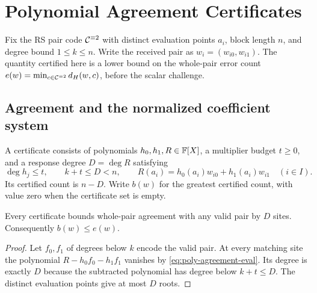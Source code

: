 \section{Polynomial Agreement Certificates}\label{sec:polynomial-agreement}

Fix the RS pair code \(\mathcal C^{\equiv 2}\) with distinct evaluation points \(a_i\),
block length \(n\), and degree bound \(1\le k\le n\). Write the received pair
as \(w_i=(w_{i0},w_{i1})\). The quantity certified here is a lower bound on
the whole-pair error count
\(e(w)=\min_{c\in\mathcal C^{\equiv 2}}d_H(w,c)\), before the scalar challenge.

\subsection{Agreement and the normalized coefficient system}

\begin{definition}
A certificate consists of polynomials \(h_0,h_1,R\in\mathbb{F}[X]\), a multiplier
budget \(t\ge0\), and a response degree \(D=\deg R\) satisfying
\begin{equation}\label{eq:poly-agreement-eval}
  \deg h_j\le t,\qquad k+t\le D<n,\qquad
  R(a_i)=h_0(a_i)w_{i0}+h_1(a_i)w_{i1}\quad(i\in I).
\end{equation}
Its certified count is \(n-D\). Write \(b(w)\) for the greatest certified
count, with value zero when the certificate set is empty.
\end{definition}

\begin{proposition}[Soundness]\label{prop:poly-agreement-sound}
Every certificate bounds whole-pair agreement with any valid pair by \(D\)
sites. Consequently \(b(w)\le e(w)\).
\end{proposition}
\begin{proof}
Let \(f_0,f_1\) of degrees below \(k\) encode the valid pair. At every
matching site the polynomial \(R-h_0f_0-h_1f_1\) vanishes by
\cref{eq:poly-agreement-eval}. Its degree is exactly \(D\) because the
subtracted polynomial has degree below \(k+t\le D\). The distinct
evaluation points give at most \(D\) roots.
\end{proof}

